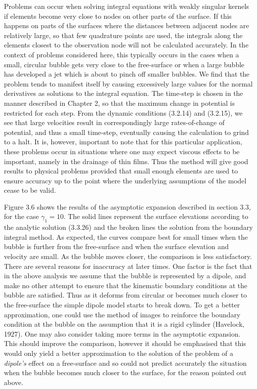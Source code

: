 Problems can occur when solving integral
equations with weakly singular kernels 
if elements become very close to nodes on
other parts of the surface.
If this happens on parts of the surfaces where the distances between
adjacent nodes are
relatively large, so that few quadrature points are used,
the integrals along the elements closest to the observation node 
will not be calculated accurately.
In the context of problems considered here,
this typically occurs in the cases 
when a small, circular bubble gets very close to the free-surface
or when a large bubble has developed a jet which is about to pinch 
off smaller bubbles. We find that the problem tends to manifest
itself by causing excessively
large values for the normal derivatives as solutions to the
integral equation. 
The time-step is chosen in the manner described in Chapter 2,
so that the maximum change in potential is restricted for each step.
From the dynamic conditions
(3.2.14) and (3.2.15), we see that large velocities
result in correspondingly large rates-of-change of potential,
and thus a small time-step, eventually causing 
the calculation to grind to a halt.
It is, however, important to note that for this particular application,
these problems occur in situations where
one may expect viscous effects to be important, namely
in the drainage of thin films. 
Thus the method will give good results to physical problems
provided that small enough elements are used
to ensure accuracy up to the point 
where the underlying assumptions of the model cease to be valid.

Figure 3.6 shows the  results  of  the  asymptotic  expansion
described in section 3.3, for the case $\gamma_1=10$.
The solid lines represent the 
surface elevations according to the analytic solution (3.3.26)
and the broken lines the solution from the boundary integral method. 
As expected, the curves compare best for small times when the bubble is 
further from the free-surface and when the surface elevation 
and velocity are small. As the bubble moves closer, the comparison is less satisfactory.
There are several reasons for inaccuracy at later times.
One factor is the fact that in the
above analysis we assume that the bubble is represented by a dipole, and
make no other attempt to ensure that the kinematic boundary conditions at 
the bubble are satisfied. Thus as it deforms  from  circular  or 
becomes much closer to the free-surface the simple dipole model starts to
break down. To get a better approximation, one could use 
the method of images to reinforce the boundary condition at the bubble on 
the assumption that it is a rigid cylinder (Havelock, 1927).
One may also consider taking more terms in the asymptotic expansion.
This should improve the comparison, however it should be emphasised
that this would only yield a better approximation to the solution of the 
problem of a {\it dipole's} effect on a free-surface and so could not
predict accurately the situation when the bubble becomes much
closer to the surface, for the reason pointed out above.

